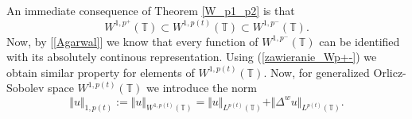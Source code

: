\documentclass[12pt,a4paper,oneside,titlepage]{article}
\begin{document}
\bigskip
An immediate consequence of Theorem \ref{W_p1_p2} is that
\begin{equation}
\label{zawieranie_Wp+-}
 W^{1,p^{+}}(\mathbb{T}) \subset W^{1,p(t)}(\mathbb{T}) \subset W^{1,p^{-}}(\mathbb{T}).
\end{equation}
Now, by [\ref{Agarwal}] we know that every function of $W^{1,p^{-}}(\mathbb{T})$ can be identified with its absolutely continous representation. Using (\ref{zawieranie_Wp+-}) we obtain similar property for elements of $W^{1,p(t)}(\mathbb{T})$.
\bigskip
\indent
Now, for generalized Orlicz-Sobolev space $W^{1,p(t)}(\mathbb{T})$ we introduce the norm
\begin{equation}
\label{NORMA_Sobolew}
\Vert u \Vert_{1,p(t)}:=\Vert u \Vert_{W^{1,p(t)}(\mathbb{T})} =  \Vert u \Vert_{L^{p(t)}(\mathbb{T})}+ \Vert \Delta^{w} u \Vert_{L^{p(t)}(\mathbb{T})}.
\end{equation}
\end{document}
